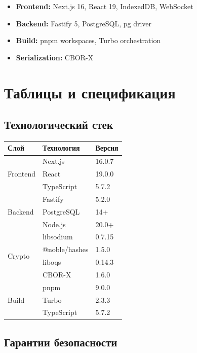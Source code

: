 \documentclass[11pt,a4paper,oneside]{book}
\begin{document}
\begin{itemize}
  \item \textbf{Frontend:} Next.js 16, React 19, IndexedDB, WebSocket
  \item \textbf{Backend:} Fastify 5, PostgreSQL, pg driver
  \item \textbf{Build:} pnpm workspaces, Turbo orchestration
  \item \textbf{Serialization:} CBOR-X
\end{itemize}
\vspace{-1cm}\part{Таблицы и спецификация}
\vspace{-0.5cm}\chapter{Технологический стек}
\begin{table}[h]
\centering
\begin{tabular}{|l|l|l|}
\hline
\textbf{Слой} & \textbf{Технология} & \textbf{Версия} \\
\hline
\multirow{3}{*}{Frontend} & Next.js & 16.0.7 \\
& React & 19.0.0 \\
& TypeScript & 5.7.2 \\
\hline
\multirow{3}{*}{Backend} & Fastify & 5.2.0 \\
& PostgreSQL & 14+ \\
& Node.js & 20.0+ \\
\hline
\multirow{4}{*}{Crypto} & libsodium & 0.7.15 \\
& @noble/hashes & 1.5.0 \\
& liboqs & 0.14.3 \\
& CBOR-X & 1.6.0 \\
\hline
\multirow{3}{*}{Build} & pnpm & 9.0.0 \\
& Turbo & 2.3.3 \\
& TypeScript & 5.7.2 \\
\hline
\end{tabular}
\end{table}
\vspace{-0.5cm}\chapter{Гарантии безопасности}
\end{document}
